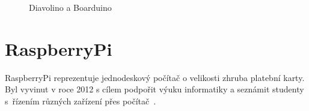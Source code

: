 \begin{figure}[!ht]
    \centering
			\hspace*{5mm}
					\caption{Diavolino a Boarduino}
					\vspace{-30pt}	
	\end{figure}	


\section{RaspberryPi}
\label{KapRaspi}

RaspberryPi reprezentuje jednodeskový počítač o velikosti zhruba platební karty. Byl vyvinut v roce 2012 s cílem podpořit výuku informatiky a seznámit studenty s~řízením různých zařízení přes počítač~\cite{Raspi}. 

